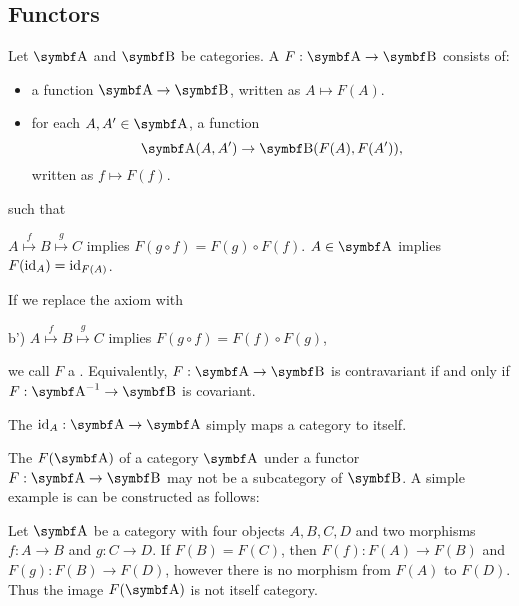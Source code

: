 \subsection{Functors}\label{subsec:functors}

\begin{definition}\label{def:functor}\cite[definitions 1.2.1, 1.2.10]{Leinster2014}
  Let \( \Cat{A} \) and \( \Cat{B} \) be categories. A  \( F: \Cat{A} \to \Cat{B} \) consists of:
  \begin{itemize}
    \item a function \( \Cat{A} \to \Cat{B} \), written as \( A \mapsto F(A) \).
    \item for each \( A, A' \in \Cat{A} \), a function
    \begin{equation*}
      \Cat{A}(A, A') \to \Bold{B}(F(A), F(A')),
    \end{equation*}
    written as \( f \mapsto F(f) \).
  \end{itemize}
  such that
  \begin{defenum}
     \( A \overset f \mapsto B \overset g \mapsto C \) implies \( F(g \circ f) = F(g) \circ F(f) \).
     \( A \in \Cat{A} \) implies \( F(\operatorname{id}_A) = \operatorname{id}_{F(A)} \).
  \end{defenum}

  If we replace the axiom  with
  \begin{defenum}
    \item[b')]\label{def:functor/contravariant_composition_axiom} \( A \overset f \mapsto B \overset g \mapsto C \) implies \( F(g \circ f) = F(f) \circ F(g) \),
  \end{defenum}
  we call \( F \) a . Equivalently, \( F: \Cat{A} \to \Cat{B} \) is contravariant if and only if \( F: \Cat{A}^{-1} \to \Cat{B} \) is covariant.

  The  \( \Id_A: \Cat{A} \to \Cat{A} \) simply maps a category to itself.
\end{definition}

\begin{remark}\label{remark:image_of_functor_maybe_not_subcategory}
  The  \( F(\Cat{A}) \) of a category \( \Cat{A} \) under a functor \( F: \Cat{A} \to \Cat{B} \) may not be a subcategory of \( \Cat{B} \). A simple example is can be constructed as follows:

  Let \( \Cat{A} \) be a category with four objects \( A, B, C, D \) and two morphisms \( f: A \to B \) and \( g: C \to D \). If \( F(B) = F(C) \), then \( F(f): F(A) \to F(B) \) and \( F(g): F(B) \to F(D) \), however there is no morphism from \( F(A) \) to \( F(D) \). Thus the image \( F(\Cat{A}) \) is not itself category.
\end{remark}

